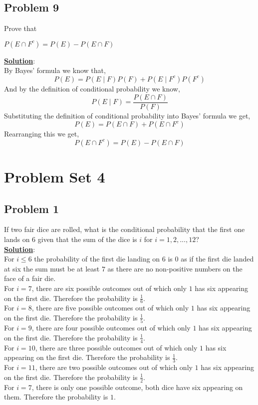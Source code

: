 \documentclass[11pt,letter paper]{report}
\begin{document}
\subsection*{Problem 9}
Prove that
\begin{center}
$P(E\cap F^c)=P(E)-P(E\cap F)$
\end{center}
{\bf \underline{Solution}}:\\
By Bayes' formula we know that, $$P(E)=P(E\mid F)P(F)+P(E\mid F^c)P(F^c)$$
And by the definition of conditional probability we know, $$P(E\mid F)=\frac{P(E\cap F)}{P(F)}$$
Substituting the definition of conditional probability into Bayes' formula we get, $$P(E)=P(E\cap F)+P(E\cap F^c)$$
Rearranging this we get, $$P(E\cap F^c)=P(E)-P(E\cap F)$$ 

%
\section*{Problem Set 4}

\subsection*{Problem 1}
If two fair dice are rolled, what is the conditional probability that the first one lands on $6$ given that the sum of the dice is $i$ for $i=1,2,...,12$?\\[0.1cm]
{\bf \underline{Solution}}:\\
For $i\le 6$ the probability of the first die landing on $6$ is \underline{\underline{$0$}} as if the first die landed at six the sum must be at least $7$ as there are no non-positive numbers on the face of a fair die.\\ 
For $i=7$, there are six possible outcomes out of which only $1$ has six appearing on the first die. Therefore the probability is \underline{\underline{$\frac{1}{6}$}}.\\
For $i=8$, there are five possible outcomes out of which only $1$ has six appearing on the first die. Therefore the probability is \underline{\underline{$\frac{1}{5}$}}.\\
For $i=9$, there are four possible outcomes out of which only $1$ has six appearing on the first die. Therefore the probability is \underline{\underline{$\frac{1}{4}$}}.\\
For $i=10$, there are three possible outcomes out of which only $1$ has six appearing on the first die. Therefore the probability is \underline{\underline{$\frac{1}{3}$}}.\\
For $i=11$, there are two possible outcomes out of which only $1$ has six appearing on the first die. Therefore the probability is \underline{\underline{$\frac{1}{2}$}}.\\
For $i=7$, there is only one possible outcome, both dice have six appearing on them. Therefore the probability is \underline{\underline{$1$}}.
\end{document}
